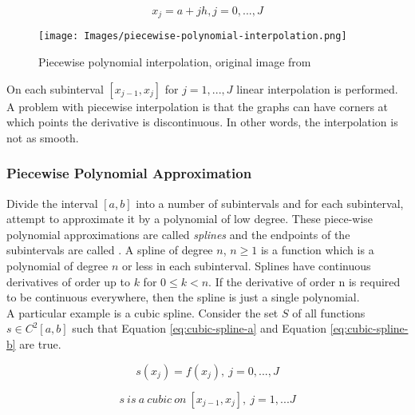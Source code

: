 \begin{equation}
    x_j = a + jh, j = 0, ..., J
\end{equation}

\begin{figure}[H]
\begin{center}
    \texttt{[image: Images/piecewise-polynomial-interpolation.png]}
    \caption{Piecewise polynomial interpolation, original image from \cite{m2aa3-notes}}
    \label{fig:piecewise-polynomial-interpolation}
\end{center}
\end{figure}

On each subinterval $[x_{j-1}, x_j]$ for $j = 1,...,J$ linear interpolation is performed. \\

A problem with piecewise interpolation is that the graphs can have corners at which points the derivative is discontinuous. In other words, the interpolation is not as smooth.

\subsubsection{Piecewise Polynomial Approximation}

Divide the interval $[a,b]$ into a number of subintervals and for each subinterval, attempt to approximate it by a polynomial of low degree. These piece-wise polynomial approximations are called \textit{splines} and the endpoints of the subintervals are called \cite{intro-to-numerical-analysis-suli}. A spline of degree $n$, $n \geq 1$ is a function which is a polynomial of degree $n$ or less in each subinterval. Splines have continuous derivatives of order up to $k$ for $0 \leq k < n$. If the derivative of order n is required to be continuous everywhere, then the spline is just a single polynomial. \\

A particular example is a cubic spline. Consider the set $S$ of all functions $s \in C^2[a,b]$ such that Equation \ref{eq:cubic-spline-a} and Equation \ref{eq:cubic-spline-b} are true.

\begin{equation}
\label{eq:cubic-spline-a}
    s(x_j) = f(x_j),\ j = 0,...,J
\end{equation}

\begin{equation}
\label{eq:cubic-spline-b}
    s\ is\ a\ cubic\ on\ [x_{j-1}, x_j],\ j=1,...J
\end{equation}


